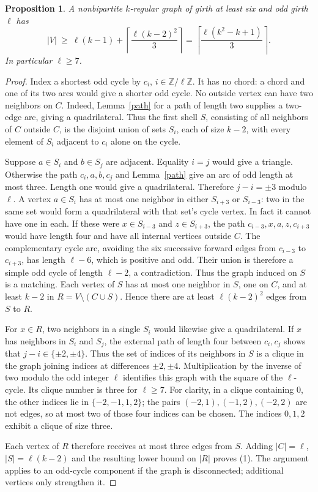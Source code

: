 \documentclass[11pt,a4paper]{article}
\newtheorem{proposition}[lemma]{Proposition}
\begin{document}
\begin{proposition}\label{bound}
A nonbipartite $k$-regular graph of girth at least six and odd girth
$\ell$ has
\[
 |V|\ \geq\ \ell(k-1)+
       \left\lceil\frac{\ell(k-2)^2}3\right\rceil
 =\left\lceil\frac{\ell(k^2-k+1)}3\right\rceil .             \tag{1}
\]
In particular $\ell\geq7$.
\end{proposition}
\begin{proof}
Index a shortest odd cycle by $c_i$, $i\in\mathbb Z/\ell\mathbb Z$.
It has no chord: a chord and one of its two arcs would give a shorter
odd cycle. No outside vertex can have two neighbors on $C$. Indeed,
Lemma~\ref{path} for a path of length two supplies a two-edge arc,
giving a quadrilateral. Thus the first shell $S$, consisting of all
neighbors of $C$ outside $C$, is the disjoint union of sets $S_i$,
each of size $k-2$, with every element of $S_i$ adjacent to $c_i$ alone
on the cycle.

Suppose $a\in S_i$ and $b\in S_j$ are adjacent. Equality $i=j$ would
give a triangle. Otherwise the path $c_i,a,b,c_j$ and
Lemma~\ref{path} give an arc of odd length at most three. Length one
would give a quadrilateral. Therefore $j-i=\pm3$ modulo $\ell$.
A vertex $a\in S_i$ has at most one neighbor in either $S_{i+3}$ or
$S_{i-3}$: two in the same set would form a quadrilateral with that
set's cycle vertex. In fact it cannot have one in each. If these were
$x\in S_{i-3}$ and $z\in S_{i+3}$, the path
$c_{i-3},x,a,z,c_{i+3}$ would have length four and have all internal
vertices outside $C$. The complementary cycle arc, avoiding the six
successive forward edges from $c_{i-3}$ to $c_{i+3}$, has length
$\ell-6$, which is positive and odd. Their union is therefore a simple
odd cycle of length $\ell-2$, a contradiction. Thus the graph induced
on $S$ is a matching. Each vertex of $S$ has at most one neighbor in
$S$, one on $C$, and at least $k-2$ in
$R=V\setminus(C\cup S)$. Hence there are at least
$\ell(k-2)^2$ edges from $S$ to $R$.

For $x\in R$, two neighbors in a single $S_i$ would likewise give a
quadrilateral. If $x$ has neighbors in $S_i$ and $S_j$, the external
path of length four between $c_i,c_j$ shows that
$j-i\in\{\pm2,\pm4\}$. Thus the set of indices of its neighbors in
$S$ is a clique in the graph joining indices at differences
$\pm2,\pm4$. Multiplication by the inverse of two modulo the odd
integer $\ell$ identifies this graph with the square of the
$\ell$-cycle. Its clique number is three for $\ell\geq7$.
For clarity, in a clique containing $0$, the other indices lie in
$\{-2,-1,1,2\}$; the pairs $(-2,1),(-1,2),(-2,2)$ are not edges,
so at most two of those four indices can be chosen. The indices
$0,1,2$ exhibit a clique of size three.

Each vertex of $R$ therefore receives at most three edges from $S$.
Adding $|C|=\ell$, $|S|=\ell(k-2)$ and the resulting lower bound
on $|R|$ proves (1). The argument applies to an odd-cycle component
if the graph is disconnected; additional vertices only strengthen it.
\end{proof}
\end{document}
